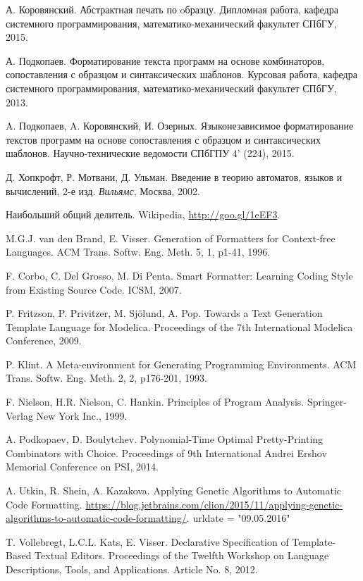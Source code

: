 \begin{thebibliography}{99}

  А. Коровянский. Абстрактная печать по oбразцу.
  Дипломная работа, кафедра системного программирования, математико-механический факультет СПбГУ, 2015.

  А. Подкопаев. Форматирование текста программ на основе комбинаторов, сопоставления с образцом и синтаксических шаблонов.
  Курсовая работа, кафедра системного программирования, математико-механический факультет СПбГУ, 2013.

  A. Подкопаев, A. Коровянский, И. Озерных.
  Языконезависимое форматирование текстов программ на основе сопоставления с образцом и синтаксических шаблонов.
  Научно-технические ведомости СПбГПУ 4' (224), 2015.

  Д. Хопкрофт, Р. Мотвани, Д. Ульман.
  Введение в теорию автоматов, языков и вычислений, 2-е изд.
  \emph{Вильямс}, Москва, 2002.

  Наибольший общий делитель. Wikipedia, \url{http://goo.gl/1eEF3}.

  M.G.J. van den Brand,  E. Visser.
  Generation of Formatters for Context-free Languages.
  ACM Trans. Softw. Eng. Meth. 5, 1, p1-41, 1996.

  F. Corbo, C. Del Grosso, M. Di Penta.
  Smart Formatter: Learning Coding Style from Existing Source Code.
  ICSM, 2007.

  P. Fritzson, P. Privitzer, M. Sjölund, A. Pop.
  Towards a Text Generation Template Language for Modelica.
  Proceedings of the 7th International Modelica Conference, 2009. 

  P. Klint.
  A Meta-environment for Generating Programming Environments.
  ACM Trans. Softw. Eng. Meth. 2, 2, p176-201, 1993.

  F. Nielson, H.R. Nielson, C. Hankin.
  Principles of Program Analysis.
  Springer-Verlag New York Inc., 1999.

  A. Podkopaev, D. Boulytchev.
  Polynomial-Time Optimal Pretty-Printing Combinators with Choice.
  Proceedings of 9th International Andrei Ershov Memorial Conference on PSI, 2014.

  A. Utkin, R. Shein, A. Kazakova.
  Applying Genetic Algorithms to Automatic Code Formatting.
  \url{https://blog.jetbrains.com/clion/2015/11/applying-genetic-algorithms-to-automatic-code-formatting/}.
  urldate      = "09.05.2016"

  T. Vollebregt, L.C.L. Kats, E. Visser.
  Declarative Specification of Template-Based Textual Editors.
  Proceedings of the Twelfth Workshop on Language Descriptions, Tools, and Applications. Article No. 8, 2012.

\end{thebibliography}

